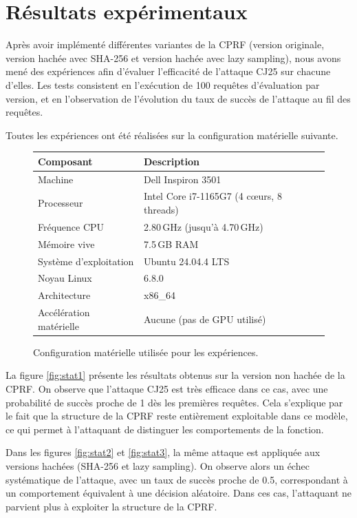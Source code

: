 \documentclass[9pt]{extarticle}
\begin{document}
\section{Résultats expérimentaux}

Après avoir implémenté différentes variantes de la CPRF (version originale, version hachée avec SHA-256 et version hachée avec lazy sampling), 
nous avons mené des expériences afin d’évaluer l’efficacité de l’attaque CJ25 sur chacune d’elles. 
Les tests consistent en l’exécution de 100 requêtes d’évaluation par version, et en l’observation de l’évolution du taux de succès de l’attaque au fil des requêtes.

Toutes les expériences ont été réalisées sur la configuration matérielle suivante.

\begin{figure}[h]
\centering
\begin{tabular}{ll}
\hline
\textbf{Composant} & \textbf{Description} \\
\hline
Machine & Dell Inspiron 3501 \\
Processeur & Intel Core i7-1165G7 (4 cœurs, 8 threads) \\
Fréquence CPU & 2.80\,GHz (jusqu’à 4.70\,GHz) \\
Mémoire vive & 7.5\,GB RAM \\
Système d’exploitation & Ubuntu 24.04.4 LTS \\
Noyau Linux & 6.8.0 \\
Architecture & x86\_64 \\
Accélération matérielle & Aucune (pas de GPU utilisé) \\
\hline
\end{tabular}

\caption{Configuration matérielle utilisée pour les expériences.}
\label{fig:setup}
\end{figure}


La figure \ref{fig:stat1} présente les résultats obtenus sur la version non hachée de la CPRF. 
On observe que l’attaque CJ25 est très efficace dans ce cas, avec une probabilité de succès proche de 1 dès les premières requêtes. 
Cela s’explique par le fait que la structure de la CPRF reste entièrement exploitable dans ce modèle, ce qui permet à l’attaquant de distinguer les comportements de la fonction.

Dans les figures \ref{fig:stat2} et \ref{fig:stat3}, la même attaque est appliquée aux versions hachées (SHA-256 et lazy sampling). On observe alors un échec systématique de l’attaque, avec un taux de succès proche de 0.5, correspondant à un comportement équivalent à une décision aléatoire. Dans ces cas, l’attaquant ne parvient plus à exploiter la structure de la CPRF.
\end{document}

